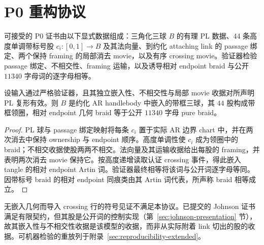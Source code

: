 \section{P0 重构协议}\label{app:p0-reconstruction}

可接受的 P0 证书由以下显式数据组成：三角化三球 $B$ 的有理 PL 数据、44 条高度单调带标号股 $c_i:[0,1]\to B$ 及其法向量、到约化 attaching link 的 passage 绑定、两个保持 framing 的局部消去 movie，以及有序 crossing movie。验证器检验 passage 绑定、不相交性、framing 运输，以及诱导相对 endpoint braid 与公开 $11340$ 字母词的逐字母相等。

\begin{lemma}[P0 证书的正确性]
设输入通过严格验证器，且其独立嵌入性、不相交性与局部 movie 收据对所声明 PL 复形有效。则 $B$ 是约化 AR handlebody 中嵌入的带框三球，其 $44$ 股构成带框领圈，相对 endpoint 几何 braid 等于公开 $11340$ 字母 pure braid。
\end{lemma}

\begin{proof}
PL 球与 passage 绑定映射将每条 $c_i$ 置于实际 AR 边界 chart 中，并在两次消去中保持 ownership 与 endpoint 顺序。高度单调性使 $c_i$ 成为领圈中的 braid；不相交收据使股两两不相交。法向量及其运输收据给出每股的 framing，并表明两次消去 movie 保持它。按高度递增读取认证 crossing 事件，得此嵌入 tangle 的相对 endpoint Artin 词。验证器最终相等将该词与公开词逐字母等同。因带标号 braid 的相对 endpoint 同痕类由其 Artin 词代表，所声称 braid 相等成立。
\end{proof}

\begin{remark}
无嵌入几何而导入 crossing 行的符号见证不满足本协议。已提交的 Johnson 证书满足有限契约，但其股是公开词的控制实现（第~\ref{sec:johnson-presentation} 节），故其嵌入性与不相交性收据是该模型的收据，而非从实际附着 link 切出的股的收据。可机器检验的重放列于附录~\ref{sec:reproducibility-extended}。
\end{remark}
